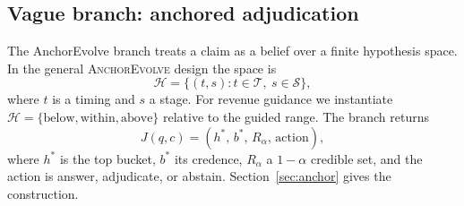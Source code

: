 \documentclass[11pt]{article}
\newcommand{\anchor}{\textsc{AnchorEvolve}}
\begin{document}
\subsection{Vague branch: anchored adjudication}
The AnchorEvolve branch treats a claim as a belief over a finite hypothesis space. In the general \anchor{} design the space is
\begin{equation}
\mathcal H=\{(t,s): t\in\mathcal T,\ s\in\mathcal S\},
\end{equation}
where $t$ is a timing and $s$ a stage. For revenue guidance we instantiate $\mathcal H=\{\text{below},\text{within},\text{above}\}$ relative to the guided range. The branch returns
\begin{equation}
J(q,c)=(h^*,\,b^*,\,R_\alpha,\,\text{action}),
\end{equation}
where $h^*$ is the top bucket, $b^*$ its credence, $R_\alpha$ a $1-\alpha$ credible set, and the action is answer, adjudicate, or abstain. Section~\ref{sec:anchor} gives the construction.
\end{document}
